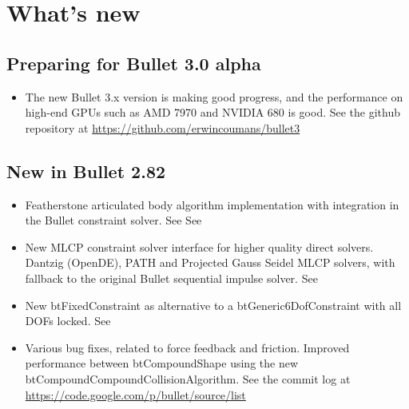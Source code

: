 \section{What's new}

\subsection{Preparing for Bullet 3.0 alpha}
\begin{itemize}
	\item The new Bullet 3.x version is making good progress, and the performance on high-end GPUs such as AMD 7970 and NVIDIA 680 is good. See the github repository at \url{https://github.com/erwincoumans/bullet3}
\end{itemize}
\subsection{New in Bullet 2.82}
\begin{itemize}
	\item Featherstone articulated body algorithm implementation with integration in the Bullet constraint solver. See See 
	\item New MLCP constraint solver interface for higher quality direct solvers. Dantzig (OpenDE), PATH and Projected Gauss Seidel MLCP solvers, with fallback to the original Bullet sequential impulse solver. See 
	\item New btFixedConstraint as alternative to a btGeneric6DofConstraint with all DOFs locked. See 
	\item Various bug fixes, related to force feedback and friction. Improved performance between btCompoundShape using the new btCompoundCompoundCollisionAlgorithm. See the commit log at \url{https://code.google.com/p/bullet/source/list}
\end{itemize}
